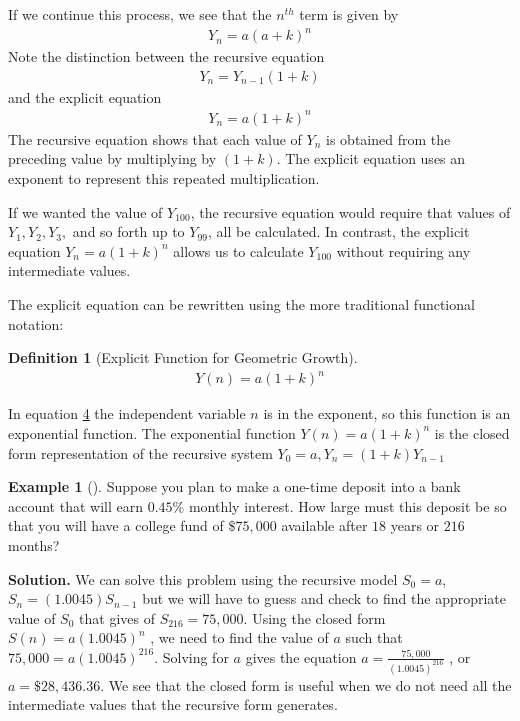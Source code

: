 \documentclass[10pt,]{book}
\theoremstyle{plain}
\theoremstyle{definition}
\newtheorem{definition}[theorem]{Definition}
\theoremstyle{definition}
\newtheorem{example}[theorem]{Example}
\theoremstyle{definition}
\numberwithin{equation}{section}
\begin{document}
\hypertarget{p-87}{}%
If we continue this process, we see that the \(n^{th}\) term is given by%
%
\begin{gather*}
Y_n=a(a+k)^n
\end{gather*}
\hypertarget{p-88}{}%
Note the distinction between the recursive equation%
%
\begin{gather*}
Y_n=Y_{n-1}(1+k)
\end{gather*}
\hypertarget{p-89}{}%
and the explicit equation%
%
\begin{gather*}
Y_n=a(1+k)^n
\end{gather*}
\hypertarget{p-90}{}%
The recursive equation shows that each value of \(Y_n\)  is obtained from the preceding value by multiplying by \((1+k)\). The explicit equation uses an exponent to represent this repeated multiplication.%
\par
\hypertarget{p-91}{}%
If we wanted the value of \(Y_{100}\), the recursive equation would require that values of \(Y_1, Y_2, Y_3,\) and so forth up to \(Y_{99}\),  all be calculated. In contrast, the explicit equation \(Y_n=a(1+k)^n\) allows us to calculate \(Y_{100}\) without requiring any intermediate values.%
\par
\hypertarget{p-92}{}%
The explicit equation can be rewritten using the more traditional functional notation:%
\begin{definition}[{Explicit Function for Geometric Growth}]\label{explicit-geometric-growth-equation}
%
\begin{gather*}
Y(n)=a(1+k)^n
\end{gather*}
\end{definition}
\hypertarget{p-93}{}%
In equation \hyperref[explicit-geometric-growth-equation]{4} the independent variable \(n\) is in the exponent, so this function is an exponential function. The exponential function \(Y(n)=a(1+k)^n\) is the closed form representation of the recursive system  \(Y_0=a,Y_n=(1+k)Y_{n-1}\)%
\begin{example}[]\label{example-one-time-bank-desposit}
\hypertarget{p-94}{}%
Suppose you plan to make a one-time deposit into a bank account that will earn \(0.45\%\) monthly interest.  How large must this deposit be so that you will have a college fund of \(\$75,000\) available after \(18\) years or \(216\) months?%
\par\smallskip%
\noindent\textbf{Solution.}\hypertarget{solution-7}{}\quad%
\hypertarget{p-95}{}%
We can solve this problem using the recursive model \(S_0 = a\), \(S_n = (1.0045) S_{n-1}\) but we will have to guess and check to find the appropriate value of \(S_0\) that gives of \(S_{216} = 75,000\).  Using the closed form \(S(n)=a(1.0045)^n\) , we need to find the value of \(a\) such that \(75,000 = a (1.0045)^{216}\).  Solving for \(a\) gives the equation \(a = \frac{75,000}{(1.0045)^{216}}\) , or \(a = \$28,436.36\).  We see that the closed form is useful when we do not need all the intermediate values that the recursive form generates.%
\end{example}
\end{document}
